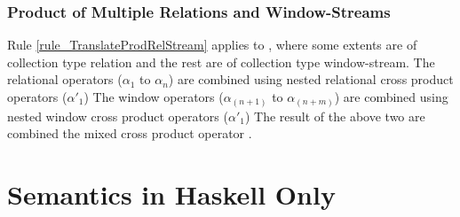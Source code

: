 \subsubsection{Product of Multiple Relations and Window-Streams}

Rule \ref{rule_TranslateProdRelStream} applies to ,
where some extents are of collection type relation and the rest are of collection
type window-stream.
The relational operators ($\alpha_1$ to $\alpha_n$) are combined using nested relational cross product operators  ($\alpha'_1$)
The window operators ($\alpha_{(n+1)}$ to $\alpha_{(n+m)}$) are combined using nested window cross product operators  ($\alpha'_1$)
The result of the above two are combined the mixed cross product operator .


\section{Semantics in Haskell Only}

